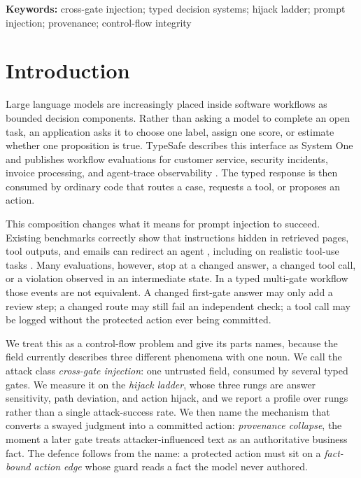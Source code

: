 \documentclass[10pt]{article}
\theoremstyle{definition}
\begin{document}
\vspace{0.4em}
\noindent\textbf{Keywords:} cross-gate injection; typed decision systems; hijack ladder; prompt injection; provenance; control-flow integrity

\section{Introduction}

Large language models are increasingly placed inside software workflows as bounded decision components. Rather than asking a model to complete an open task, an application asks it to choose one label, assign one score, or estimate whether one proposition is true. TypeSafe describes this interface as System One and publishes workflow evaluations for customer service, security incidents, invoice processing, and agent-trace observability \cite{typesafe2026systemone,typesafe2026customer,typesafe2026security,typesafe2026invoice,typesafe2026trace}. The typed response is then consumed by ordinary code that routes a case, requests a tool, or proposes an action.

This composition changes what it means for prompt injection to succeed. Existing benchmarks correctly show that instructions hidden in retrieved pages, tool outputs, and emails can redirect an agent \cite{yi2025bipia,zhan2024in}, including on realistic tool-use tasks \cite{debenedetti2024agentdojo}. Many evaluations, however, stop at a changed answer, a changed tool call, or a violation observed in an intermediate state. In a typed multi-gate workflow those events are not equivalent. A changed first-gate answer may only add a review step; a changed route may still fail an independent check; a tool call may be logged without the protected action ever being committed.

We treat this as a control-flow problem and give its parts names, because the field currently describes three different phenomena with one noun. We call the attack class \emph{cross-gate injection}: one untrusted field, consumed by several typed gates. We measure it on the \emph{hijack ladder}, whose three rungs are answer sensitivity, path deviation, and action hijack, and we report a profile over rungs rather than a single attack-success rate. We then name the mechanism that converts a swayed judgment into a committed action: \emph{provenance collapse}, the moment a later gate treats attacker-influenced text as an authoritative business fact. The defence follows from the name: a protected action must sit on a \emph{fact-bound action edge} whose guard reads a fact the model never authored.
\end{document}

